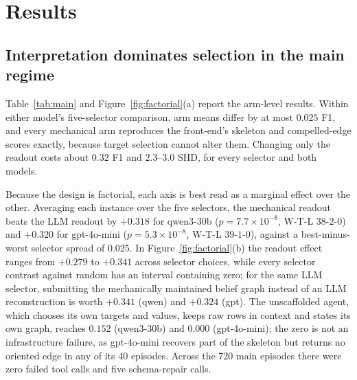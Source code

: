 \documentclass{article}
\begin{document}
\section{Results}
\label{sec:results}

\subsection{Interpretation dominates selection in the main regime}
\label{sec:main}

Table~\ref{tab:main} and Figure~\ref{fig:factorial}(a) report the arm-level results. Within
either model's five-selector comparison, arm means differ by at most $0.025$ F1, and every
mechanical arm reproduces the front-end's skeleton and compelled-edge scores exactly, because
target selection cannot alter them. Changing only the readout costs about $0.32$ F1 and
$2.3$--$3.0$ SHD, for every selector and both models.

Because the design is factorial, each axis is best read as a marginal effect over the other.
Averaging each instance over the five selectors, the mechanical readout beats the LLM readout
by $+0.318$ for qwen3-30b ($p=7.7\times10^{-8}$, W-T-L $38$-$2$-$0$) and $+0.320$ for
gpt-4o-mini ($p=5.3\times10^{-8}$, W-T-L $39$-$1$-$0$), against a best-minus-worst selector
spread of $0.025$. In Figure~\ref{fig:factorial}(b) the readout effect ranges from $+0.279$ to
$+0.341$ across selector choices, while every selector contrast against random has an interval
containing zero; for the same LLM selector, submitting the mechanically maintained belief
graph instead of an LLM reconstruction is worth $+0.341$ (qwen) and $+0.324$ (gpt). The
unscaffolded agent, which chooses its own targets and values, keeps raw rows in context and
states its own graph, reaches $0.152$ (qwen3-30b) and $0.000$ (gpt-4o-mini); the zero is not
an infrastructure failure, as gpt-4o-mini recovers part of the skeleton but returns no
oriented edge in any of its 40 episodes. Across the 720 main episodes there were zero failed
tool calls and five schema-repair calls.
\end{document}
